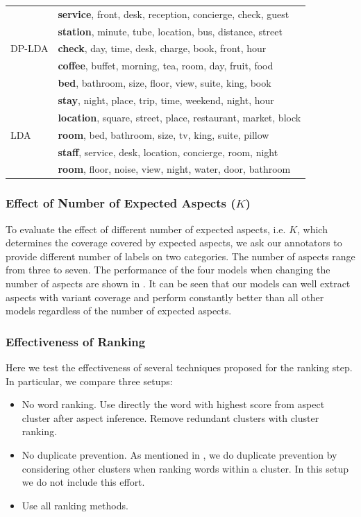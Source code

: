 \begin{table}[th]
\begin{tabular}{|l|l|}
\multirow{5}{*}{DP-LDA}
& \textbf{service}, front, desk, reception, concierge, check, guest \\
& \textbf{station}, minute, tube, location, bus, distance, street \\
& \textbf{check}, day, time, desk, charge, book, front, hour \\
& \textbf{coffee}, buffet, morning, tea, room, day, fruit, food \\
& \textbf{bed}, bathroom, size, floor, view, suite, king, book \\\hline

\multirow{5}{*}{LDA}
& \textbf{stay}, night, place, trip, time, weekend, night, hour \\
& \textbf{location}, square, street, place, restaurant, market, block \\
& \textbf{room}, bed, bathroom, size, tv, king, suite, pillow \\
& \textbf{staff}, service, desk, location, concierge, room, night \\
& \textbf{room}, floor, noise, view, night, water, door, bathroom \\\hline
\end{tabular}
\end{table}


\subsubsection{Effect of Number of Expected Aspects ($K$)}


To evaluate the effect of different number of expected aspects, i.e. $K$, which 
determines the coverage covered by expected aspects,
we ask our annotators to provide different number of labels on two categories. 
The number of aspects range from three to seven. 
The performance of the four models when changing the number of aspects are shown in . 
It can be seen that our models can well extract aspects with variant coverage and perform constantly better than all other models regardless of the number of expected aspects. 


\subsubsection{Effectiveness of Ranking}

Here we test the effectiveness of several techniques proposed for 
the ranking step.
In particular, we compare three setups:
\begin{itemize}
    \item No word ranking. 
          Use directly the word with highest score from aspect cluster after aspect inference. 
          Remove redundant clusters with cluster ranking.
    \item No duplicate prevention.
          As mentioned in , we do duplicate prevention
          by considering other clusters when ranking words within a cluster.
          In this setup we do not include this effort.
    \item Use all ranking methods.
\end{itemize}


